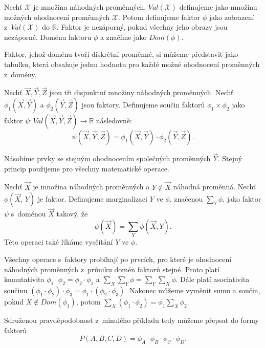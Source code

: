 Nechť $\mathcal{X}$ je množina náhodných proměnných. 
$Val(\mathcal{X})$ definujeme jako množinu možných ohodnocení proměnných $\mathcal{X}$.
Potom definujeme faktor $\phi$ jako zobrazení z~$Val(\mathcal{X})$ do $\mathbb{R}$. 
Faktor je nezáporný, pokud všechny jeho obrazy jsou nezáporné. 
Doménu faktoru $\phi$ a značíme jako $Dom(\phi)$.

Faktor, jehož doménu tvoří diskrétní proměnné, si můžeme představit jako tabulku, která obsahuje jednu hodnotu pro každé možné ohodnocení proměnných z~domény.

Nechť $\vec{X}, \vec{Y}, \vec{Z}$ jsou tři disjunktní množiny náhodných proměnných.
Nechť $\phi_1(\vec{X}, \vec{Y})$ a $\phi_2(\vec{Y}, \vec{Z})$ jsou faktory.
Definujeme součin faktorů $\phi_1 \times \phi_2$ jako faktor $\psi: Val(\vec{X}, \vec{Y}, \vec{Z}) \rightarrow \mathbb{R}$ následovně:
\begin{equation*}
\psi(\vec{X}, \vec{Y}, \vec{Z}) = \phi_1(\vec{X}, \vec{Y}) \cdot \phi_2(\vec{Y}, \vec{Z}).
\end{equation*}

Násobíme prvky se stejným ohodnocením společných proměnných $\vec{Y}$.
Stejný princip použijeme pro všechny matematické operace.

Nechť $\vec{X}$ je množina náhodných proměnných a $Y \not\in \vec{X}$ náhodná proměnná. 
Nechť $\phi(\vec{X}, \,Y)$ je faktor.
Definujeme marginalizaci $Y$ ve $\phi$, značenou $\sum_Y \phi$, jako faktor $\psi$ s~doménou $\vec{X}$ takový, že
\begin{equation*}
    \psi(\vec{X}) = \sum_Y \phi(\vec{X}, Y).
\end{equation*}
Této operaci také říkáme vysčítání $Y$ ve $\phi$.

Všechny operace s~faktory probíhají po prvcích, pro které je ohodnocení náhodných proměnných z~průniku domén faktorů stejné.
Proto platí komutativita $\phi_1 \cdot \phi_2 = \phi_2 \cdot \phi_1$ a $\sum_X \sum_Y \phi = \sum_Y \sum_X \phi$.
Dále platí asociativita součinu $(\phi_1 \cdot \phi_2) \cdot \phi_3 = \phi_1 \cdot (\phi_2 \cdot \phi_3)$.
Nakonec můžeme vyměnit sumu a součin, pokud $X \not\in Dom(\phi_1)$, potom $\sum_X (\phi_1 \cdot \phi_2) = \phi_1 \sum_X \phi_2$.

Sdruženou pravděpodobnost z~minulého příkladu tedy můžeme přepsat do formy faktorů
\begin{equation}
    P(A, B, C, D) = \phi_A \cdot \phi_B \cdot \phi_C \cdot \phi_D.
\end{equation}

